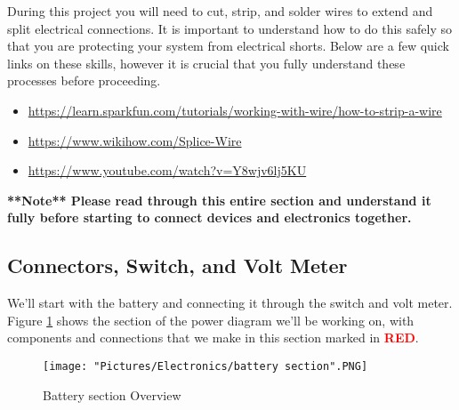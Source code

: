 \documentclass[12pt]{article}
\begin{document}
\noindent During this project you will need to cut, strip, and solder wires to extend and split electrical connections. It is important to understand how to do this safely so that you are protecting your system from electrical shorts. Below are a few quick links on these skills, however it is crucial that you fully understand these processes before proceeding. 

\begin{itemize}
	\item \href{https://learn.sparkfun.com/tutorials/working-with-wire/how-to-strip-a-wire}{https://learn.sparkfun.com/tutorials/working-with-wire/how-to-strip-a-wire}
	\item \href{https://www.wikihow.com/Splice-Wire}{https://www.wikihow.com/Splice-Wire}
	\item \href{https://www.youtube.com/watch?v=Y8wjv6lj5KU}{https://www.youtube.com/watch?v=Y8wjv6lj5KU}
\end{itemize}

\noindent \textbf{**Note** Please read through this entire section and understand it fully before starting to connect devices and electronics together. }

\subsection{Connectors, Switch, and Volt Meter}

We'll start with the battery and connecting it through the switch and volt meter. Figure \ref{battery section} shows the section of the power diagram we'll be working on, with components and connections that we make in this section marked in \textcolor{red}{\textbf{RED}}.

\begin{figure}[H]
  	\centering
    	\texttt{[image: "Pictures/Electronics/battery section".PNG]}
 	\caption{Battery section Overview}
	\label{battery section}
\end{figure}
\end{document}
